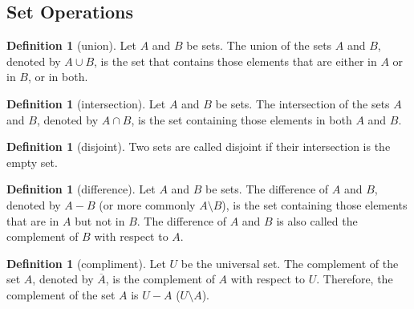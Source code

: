 \documentclass[letterpaper,10pt]{article}
\theoremstyle{plain}
\theoremstyle{definition}
\newtheorem{defn}[thm]{Definition}
\theoremstyle{remark}
\begin{document}
\newpage
\subsection{Set Operations}
\begin{defn}[union]
Let $A$ and $B$ be sets. The union of the sets $A$ and $B$, denoted by $A \cup B$, is the set that contains
those elements that are either in $A$ or in $B$, or in both.
\end{defn}
\begin{defn}[intersection]
Let $A$ and $B$ be sets. The intersection of the sets $A$ and $B$, denoted by $A \cap B$, is the set
containing those elements in both $A$ and $B$.
\end{defn}
\begin{defn}[disjoint]
Two sets are called disjoint if their intersection is the empty set.
\end{defn}
\begin{defn}[difference]
Let $A$ and $B$ be sets. The difference of $A$ and $B$, denoted by $A - B$ (or more commonly $A \setminus B$), is the set containing those
elements that are in $A$ but not in $B$. The difference of $A$ and $B$ is also called the complement
of $B$ with respect to $A$.
\end{defn}
\begin{defn}[compliment]
Let $U$ be the universal set. The complement of the set $A$, denoted by $\overline{A}$, is the complement
of $A$ with respect to $U$. Therefore, the complement of the set $A$ is $U - A$ ($U \setminus A$).
\end{defn}
\end{document}
